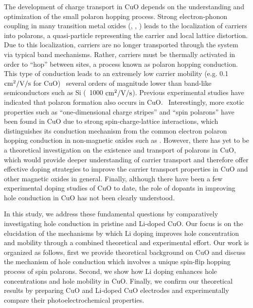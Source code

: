 The development of charge transport in CuO depends on the understanding and optimization of the small polaron hopping process. Strong electron-phonon coupling in many transition metal oxides (, , ) leads to the localization of carriers into polarons, a quasi-particle representing the carrier and local lattice distortion.\cite{rettie2016unravelling,rettie2013combined,carneiro2017excitation}
Due to this localization, carriers are no longer transported through the system via typical band mechanisms. Rather, carriers must be thermally activated in order to “hop” between sites, a process known as polaron hopping conduction.\cite{devreese1996polarons,mott1968conduction}
This type of conduction leads to an extremely low carrier mobility (e.g. 0.1 $\rm cm^2/V/s$ for CuO)~\cite{rettie2016unravelling} several orders of magnitude lower than band-like semiconductors such as Si (~1000 $\rm cm^2/V/s$). Previous experimental studies have indicated that polaron formation also occurs in CuO.~\cite{samokhvalov1993low,wu2014charge,zheng2001evidence,jeong1996nonstoichiometry,zheng2004fast}
Interestingly, more exotic properties such as ``one-dimensional charge stripes'' and ``spin polarons'' have been found in CuO due to strong spin-charge-lattice interactions,\cite{zheng2001evidence} which distinguishes its conduction mechanism from the common electron polaron hopping conduction in non-magnetic oxides such as .  However, there has yet to be a theoretical investigation on the existence and transport of polarons in CuO, which would provide deeper understanding of carrier transport and therefore offer effective doping strategies to improve the carrier transport properties in CuO and other magnetic oxides in general.
Finally, although there have been a few experimental doping studies of CuO to date,\cite{masudy2015titanium,zheng2004fast,choi2017p,gao2007ferromagnetic,masudy2015optical,zheng2003effect,chiang2016dopant,chiang2011li,chand2014structural} the role of dopants in improving hole conduction in CuO has not been clearly understood.

In this study, we address these fundamental questions by comparatively investigating hole conduction in pristine and Li-doped CuO. Our focus is on the elucidation of the mechanisms by which Li doping improves hole concentration and mobility through a combined theoretical and experimental effort. Our work is organized as follows, first we provide theoretical background on CuO and discuss the mechanism of hole conduction which involves a unique spin-flip hopping process of spin polarons. Second, we show how Li doping enhances hole concentrations and hole mobility in CuO. Finally, we confirm our theoretical results by preparing CuO and Li-doped CuO electrodes and experimentally compare their photoelectrochemical properties.

